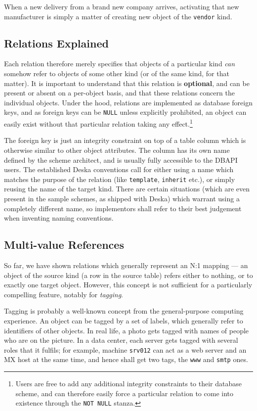 \documentclass[deska]{subfiles}
\begin{document}
When a new delivery from a brand new company arrives, activating that new manufacturer is simply a matter of
creating new object of the {\tt vendor} kind.

\subsection{Relations Explained}

Each relation therefore merely specifies that objects of a particular kind {\em can} somehow refer to objects of some
other kind (or of the same kind, for that matter).  It is important to understand that this relation is {\bf optional},
and can be present or absent on a per-object basis, and that these relations concern the individual objects.  Under the
hood, relations are implemented as database foreign keys, and as foreign keys can be {\tt NULL} unless explicitly
prohibited, an object can easily exist without that particular relation taking any effect.\footnote{Users are free to
add any additional integrity constraints to their database scheme, and can therefore easily force a particular relation
to come into existence through the {\tt NOT NULL} stanza.}

The foreign key is just an integrity constraint on top of a table column which is otherwise similar to other object
attributes.  The column has its own name defined by the scheme architect, and is usually fully accessible to the DBAPI
users.  The established Deska conventions call for either using a name which matches the purpose of the relation (like
{\tt template}, {\tt inherit} etc.), or simply reusing the name of the target kind.  There are certain situations (which
are even present in the sample schemes, as shipped with Deska) which warrant using a completely different name, so
implementors shall refer to their best judgement when inventing naming conventions.

\subsection{Multi-value References}
\label{sec:relation-multi-value-references}

So far, we have shown relations which generally represent an N:1 mapping --- an object of the source kind (a row in the
source table) refers either to nothing, or to exactly one target object.  However, this concept is not sufficient for a
particularly compelling feature, notably for {\em tagging}.

Tagging is probably a well-known concept from the general-purpose computing experience. An object can be tagged by a set
of labels, which generally refer to identifiers of other objects.  In real life, a photo gets tagged with names of
people who are on the picture.  In a data center, each server gets tagged with several roles that it fulfils; for
example, machine {\tt srv012} can act as a web server and an MX host at the same time, and hence shall get two tags, the
{\tt www} and {\tt smtp} ones.
\end{document}
